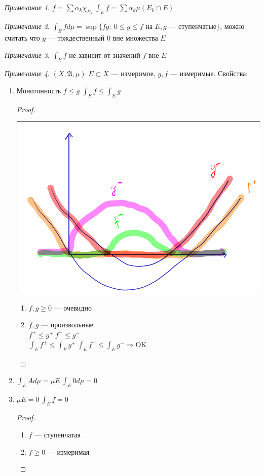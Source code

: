 \documentclass[oneside]{book}
\newcommand{\A}{\mathfrak{A}}
\theoremstyle{plain}
\theoremstyle{remark}
\newtheorem*{remark}{Примечание}
\theoremstyle{definition}
\begin{document}
\begin{remark}
\(f = \sum \alpha_k \chi_{E_k}\ \int_E f = \sum \alpha_k \mu(E_k \cap E)\)
\end{remark}
\begin{remark}
\(\int_E f d\mu = \sup \{fg:\ 0 \le g \le f\text{ на } E, g\text{ --- ступенчатые}\}\), можно считать что \(g\) ---
тождественный 0 вне множества \(E\)
\end{remark}
\begin{remark}
\(\int_E f\) не зависит от значений \(f\) вне \(E\)
\end{remark}
\begin{remark}
\((X, \A, \mu)\) \(E\subset X\) --- измеримое, \(g, f\) --- измеримые. Свойства:
\begin{enumerate}
\item \label{prop_3_1} Монотонность \(f \le g\) \(\int_E f \le \int_E g\)
\begin{proof}
\-
\begin{center}
\includegraphics[scale=0.3]{3_1.png}
\end{center}
\begin{enumerate}
\item \(f, g \ge 0\) --- очевидно
\item \(f, g\) --- произвольные \\
\(f^+ \le g^+\ f^- \le g^-\) \\
\(\int_E f^+ \le \int_E g^+\ \int_E f^- \le \int_E g^- \Rightarrow \text{OK}\)
\end{enumerate}
\end{proof}
\item \(\int_E Ad\mu = \mu E\ \int_E 0 d\mu = 0\)
\item \label{prop_3_3} \(\mu E = 0\ \int_E f= 0\)
\begin{proof}
\begin{enumerate}
\item \(f\) --- ступенчатая
\item \(f \ge 0\) --- измеримая
\end{enumerate}
\end{proof}


\end{enumerate}
\end{remark}
\end{document}
